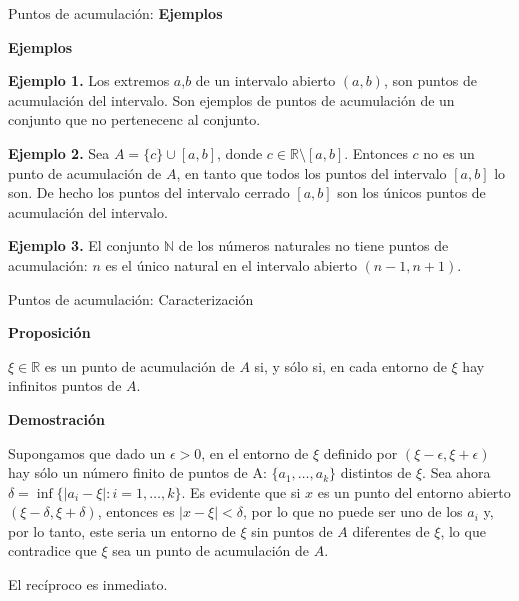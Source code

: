 \documentclass[ignorenonframetext,]{beamer}
\begin{document}
\begin{frame}{Puntos de acumulación: \textbf{Ejemplos}}
\protect\hypertarget{puntos-de-acumulaciuxf3n-ejemplos}{}

\textbf{Ejemplos}

\textbf{Ejemplo 1.} Los extremos \(a\),\(b\) de un intervalo abierto
\((a,b)\), son puntos de acumulación del intervalo. Son ejemplos de
puntos de acumulación de un conjunto que no pertenecenc al conjunto.

\textbf{Ejemplo 2.} Sea \(A=\{c\} \cup [a,b]\), donde
\(c \in \mathbb{R} \setminus [a,b]\). Entonces \(c\) no es un punto de
acumulación de \(A\), en tanto que todos los puntos del intervalo
\([a,b]\) lo son. De hecho los puntos del intervalo cerrado \([a,b]\)
son los únicos puntos de acumulación del intervalo.

\textbf{Ejemplo 3.} El conjunto \(\mathbb{N}\) de los números naturales
no tiene puntos de acumulación: \(n\) es el único natural en el
intervalo abierto \((n-1,n+1)\).

\end{frame}

\begin{frame}{Puntos de acumulación: Caracterización}
\protect\hypertarget{puntos-de-acumulaciuxf3n-caracterizaciuxf3n}{}

 \textbf{Proposición}

\(\xi \in \mathbb{R}\) es un punto de acumulación de \(A\) si, y sólo
si, en cada entorno de \(\xi\) hay infinitos puntos de \(A\).

\textbf{Demostración }

Supongamos que dado un \(\epsilon >0\), en el entorno de \(\xi\)
definido por \((\xi - \epsilon, \xi+\epsilon)\) hay sólo un número
finito de puntos de A: \(\{a_1, \ldots, a_k\}\) distintos de \(\xi\).
Sea ahora \(\delta = \inf\{ |a_i-\xi|: i=1,\ldots,k\}\). Es evidente que
si \(x\) es un punto del entorno abierto \((\xi-\delta,\xi+\delta)\),
entonces es \(|x-\xi|<\delta\), por lo que no puede ser uno de los
\(a_i\) y, por lo tanto, este seria un entorno de \(\xi\) sin puntos de
\(A\) diferentes de \(\xi\), lo que contradice que \(\xi\) sea un punto
de acumulación de \(A\).

El recíproco es inmediato.

\end{frame}
\end{document}
